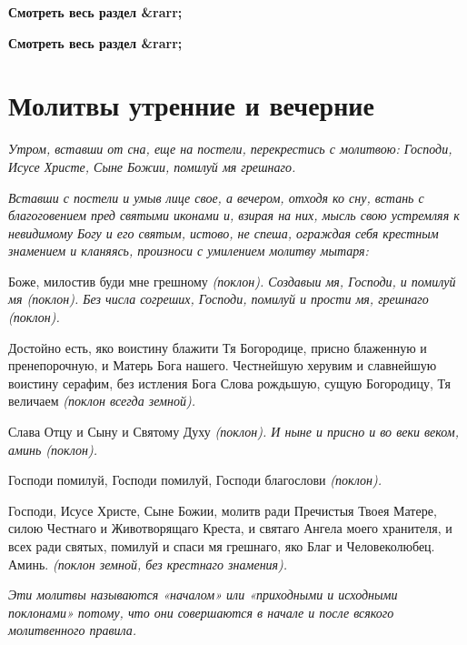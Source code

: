 




\bfseries Смотреть весь раздел &rarr;\normalfont{} 




\bfseries Смотреть весь раздел &rarr;\normalfont{} 

\section{Молитвы утренние и вечерние}



\itshape Утром, вставши от сна, еще на постели, перекрестись с молитвою:\normalfont{} Господи,
Исусе Христе, Сыне Божии, помилуй мя грешнаго.


 \itshape Вставши с постели и умыв лице свое, а вечером, отходя ко сну, встань с
благоговением пред святыми иконами и, взирая на них, мысль свою
устремляя к невидимому Богу и его святым, истово, не спеша, ограждая себя
крестным знамением и кланяясь, произноси с умилением молитву
мытаря:\normalfont{}


   Боже, милостив буди мне грешному \itshape (поклон)\normalfont{}. Создавыи мя, Господи, и
помилуй мя \itshape (поклон)\normalfont{}. Без числа согреших, Господи, помилуй и прости мя,
грешнаго \itshape (поклон)\normalfont{}.


   Достойно есть, яко воистину блажити Тя Богородице, присно блаженную
и пренепорочную, и Матерь Бога нашего. Честнейшую херувим и
славнейшую воистину серафим, без истления Бога Слова рождьшую, сущую
Богородицу, Тя величаем \itshape (поклон всегда земной)\normalfont{}.


   Слава Отцу и Сыну и Святому Духу \itshape (поклон)\normalfont{}. И ныне и присно и во веки
веком, аминь \itshape (поклон)\normalfont{}.


   Господи помилуй, Господи помилуй, Господи благослови \itshape (поклон)\normalfont{}.


   Господи, Исусе Христе, Сыне Божии, молитв ради Пречистыя Твоея
Матере, силою Честнаго и Животворящаго Креста, и святаго Ангела
моего хранителя, и всех ради святых, помилуй и спаси мя грешнаго,
яко Благ и Человеколюбец. Аминь. \itshape (поклон земной, без крестнаго
знамения)\normalfont{}.


 \itshape Эти молитвы называются «началом» или «приходными и исходными
поклонами» потому, что они совершаются в начале и после всякого
молитвенного правила.\normalfont{}


